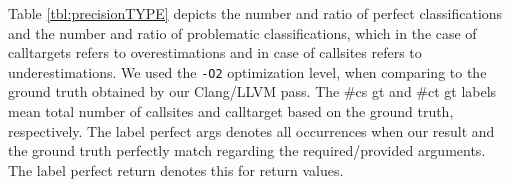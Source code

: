 \begin{table}[H]
	\caption {\textit{type} based policy classification of callsites.
        }
	\label{tbl:precisionTYPE}
\vspace{-.5cm}
\end{table}
Table \ref{tbl:precisionTYPE} depicts the number and ratio of perfect classifications 
and the number and ratio of problematic classifications, which in the case of calltargets refers to overestimations and in case of 
callsites refers to underestimations. We used the \texttt{-O2} optimization level, when comparing to the ground truth obtained by our Clang/LLVM pass.
The \#cs gt and \#ct gt labels mean total number of callsites and calltarget based on the ground truth, respectively.
The label perfect args denotes all occurrences when our result and the ground truth perfectly match regarding the required/provided arguments. The label perfect return denotes this for return values.


